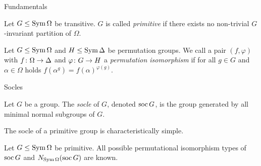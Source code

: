 \begin{frame}{Fundamentals}
    \begin{defn}
        Let $G \leq \operatorname{Sym} \Omega$ be transitive.
        $G$ is called \emph{primitive} if there exists no non-trivial
        $G$-invariant partition of $\Omega$.
    \end{defn}
    \pause

    \begin{defn}
        Let $G \leq \operatorname{Sym} \Omega$ and $H \leq \operatorname{Sym} \Delta$ be permutation groups.
        We call a pair $(f, \varphi)$ with
        $f \colon \Omega \rightarrow \Delta$
        and
        $\varphi \colon G \rightarrow H$
        a \emph{permutation isomorphism}
        if
        \pause
        for all
        $g \in G$ and $\alpha \in \Omega$ holds
        $f(\alpha ^ g) = f(\alpha) ^ {\varphi(g)}$.
    \end{defn}
\end{frame}


\begin{frame}{Socles}
    \begin{defn}
        Let $G$ be a group. The \emph{socle} of $G$, denoted $\operatorname{soc} G$,
        is the group generated by all minimal normal subgroups of $G$.
    \end{defn}
    \pause

    \begin{thm}
        The socle of a primitive group is characteristically simple.
    \end{thm}
    \pause

    \begin{thm}
        Let $G \leq \operatorname{Sym} \Omega$ be primitive.
        All possible permutational isomorphism types of $\operatorname{soc} G$
        \pause
        and
        $N_{\operatorname{Sym} \Omega}(\operatorname{soc} G)$ are known.
    \end{thm}
\end{frame}

